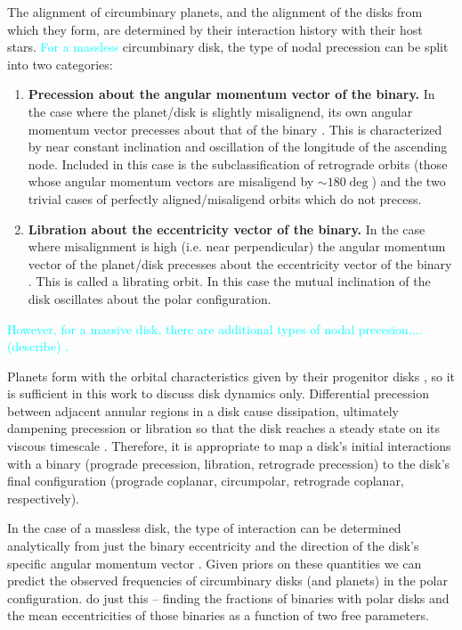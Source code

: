 \documentclass[twocolumn]{aastex631}
\newcommand{\RGM}[1]{\textcolor{cyan}{#1}}
\begin{document}
The alignment of circumbinary planets, and the alignment of the disks from which they form, are determined by their interaction history with their
host stars. \RGM{For a massless} circumbinary disk, the type of nodal precession can be split into two categories:

\begin{enumerate}
    \item {\bf Precession about the angular momentum vector of the binary.} In the case where the planet/disk
        is slightly misalignend, its own angular momentum vector precesses about that of the binary \citep[e.g.,][]{bate2000,lubow2000}.
        This is characterized by near constant
        inclination and oscillation of the longitude of the ascending node. Included in this case is the subclassification
        of retrograde orbits (those whose angular momentum vectors are misaligend by $\sim 180 \deg$) and the two
        trivial cases of perfectly aligned/misaligend orbits which do not precess. \label{enum:precession}
    \item {\bf Libration about the eccentricity vector of the binary.} In the case where misalignment is high (i.e. near
    perpendicular) the angular momentum vector of the planet/disk precesses about the eccentricity vector of the binary 
    \citep[e.g.,][]{verrier2009,farago2010,doolin2011}. This is called a librating orbit. In this case the mutual inclination of the disk oscillates about the polar configuration.
    \label{enum:libration}
\end{enumerate}

\RGM{However, for a massive disk, there are additional types of nodal precesion.... (describe) \citep{abod2022}.}

Planets form with the orbital characteristics given by their progenitor disks \citep[e.g.,][]{childs2021}, so it is sufficient in this work to
discuss disk dynamics only.
Differential precession between adjacent annular regions in a disk cause dissipation, ultimately dampening precession or libration
so that the disk reaches a steady state on its viscous timescale \citep[see also \citet{nixon2011,foucart2013,foucart2014}]{bate2000}.
Therefore, it is appropriate to map a disk's
initial interactions with a binary (prograde precession, libration, retrograde precession) to the disk's final configuration
(prograde coplanar, circumpolar, retrograde coplanar, respectively).

In the case of a massless disk, the type of interaction can be determined analytically from just the binary eccentricity and the
direction of the disk's specific angular momentum vector
\citep[parameterized by the disk inclination and its longitude of the ascending node][]{zanazzi2018}.
Given priors on these quantities we can predict the observed frequencies of circumbinary disks (and planets) in the polar configuration.
\citet{ceppi2024} do just this -- finding the fractions of binaries with polar disks and the mean eccentricities of those binaries
as a function of two free parameters.
\end{document}
